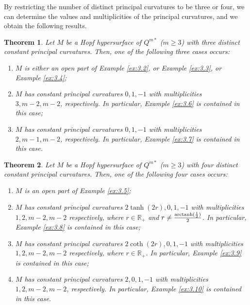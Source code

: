 \documentclass[reqno]{amsart}%
\newtheorem{theorem}{Theorem}[section]   %
\theoremstyle{definition}
\numberwithin{equation}{section}
\begin{document}
By restricting the number of distinct principal curvatures to be three or four,
we can determine the values and multiplicities of the principal curvatures, and we
obtain the following results.


\begin{theorem}\label{thm:1.1b}
Let $M$ be a Hopf hypersurface of $Q^{m*}$ ($m\geq3$) with three distinct constant principal curvatures. Then, one of the following three cases occurs:
%
\begin{enumerate}
\item[(1)]
$M$ is either an open part of Example \ref{ex:3.2}, or Example \ref{ex:3.3}, or Example \ref{ex:3.4};

\item[(2)]
$M$ has constant principal curvatures $0,1,-1$ with multiplicities $3, m-2,m-2$, respectively.
In particular, Example \ref{ex:3.6} is contained in this case;

\item[(3)]
$M$ has constant principal curvatures $0,1,-1$ with multiplicities $2, m-1,m-2$, respectively.
In particular, Example \ref{ex:3.7} is contained in this case.
\end{enumerate}
\end{theorem}


\begin{theorem}\label{thm:1.1c}
Let $M$ be a Hopf hypersurface of $Q^{m*}$ ($m\geq3$) with four distinct constant principal curvatures. Then, one of the following four cases occurs:
%
\begin{enumerate}
\item[(1)]
$M$ is an open part of Example \ref{ex:3.5};

\item[(2)]
$M$ has constant principal curvatures $2\tanh(2r),0,1,-1$ with multiplicities $1,2, m-2,m-2$  respectively, where $r\in \mathbb{R}_+$ and $r\neq\frac{{\rm arctanh}(\frac{1}{2})}{2}$.
In particular, Example \ref{ex:3.8} is contained in this case;

\item[(3)]
$M$ has constant principal curvatures $2\coth(2r),0,1,-1$ with multiplicities $1,2, m-2,m-2$ respectively, where $r\in \mathbb{R}_+$.
In particular, Example \ref{ex:3.9} is contained in this case;


\item[(4)]
$M$ has constant principal curvatures $2,0,1,-1$ with multiplicities $1,2, m-2,m-2$, respectively.
In particular, Example \ref{ex:3.10} is contained in this case.
\end{enumerate}
\end{theorem}
\end{document}
